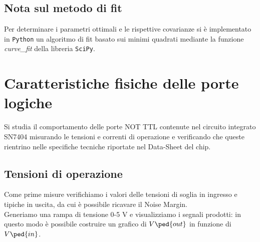 \documentclass[10pt, a4paper, italian]{article}
\begin{document}
\subsection*{Nota sul metodo di fit}
Per determinare i parametri ottimali e le rispettive covarianze si \`e
implementato in \verb+Python+ un algoritmo di fit basato sui minimi quadrati
mediante la funzione \emph{curve\_fit} della libreria \texttt{SciPy}.

\section{Caratteristiche fisiche delle porte logiche}
Si studia il comportamento delle porte NOT TTL contenute nel circuito integrato
SN7404 misurando le tensioni e correnti di operazione e verificando che queste
rientrino nelle specifiche tecniche riportate nel Data-Sheet del chip.

\subsection{Tensioni di operazione}
Come prime misure verifichiamo i valori delle tensioni di soglia in ingresso e tipiche in uscita, da cui è possibile ricavare il Noise Margin.\\
Generiamo una rampa di tensione 0-5 V e visualizziamo i segnali prodotti:
in questo modo è possibile costruire un grafico di $V\ped{out}$ in funzione di $V\ped{in}$.\\ %
\end{document}
